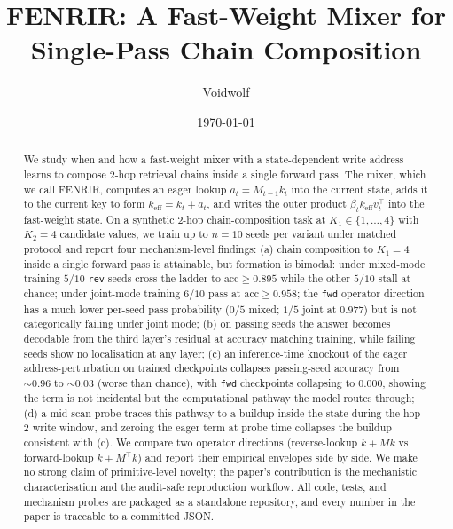 \documentclass[11pt]{article}
\title{FENRIR: A Fast-Weight Mixer for Single-Pass Chain Composition}
\author[1]{Voidwolf}
\affil[1]{Independent researcher \\ \texttt{research@voidwolf.space}}
\date{\today}
\newcommand{\claim}[1]{#1}
\begin{document}
\maketitle

\begin{abstract}
We study when and how a fast-weight mixer with a state-dependent write
address learns to compose 2-hop retrieval chains inside a single
forward pass. The mixer, which we call FENRIR, computes an eager
lookup $a_t = M_{t-1} k_t$ into the current state, adds it to the
current key to form $k_{\text{eff}} = k_t + a_t$, and writes the outer
product $\beta_t k_{\text{eff}} v_t^{\top}$ into the fast-weight state.
On a synthetic 2-hop chain-composition task at $K_1 \in \{1, \dots, 4\}$
with $K_2 = 4$ candidate values, we train up to $n = 10$ seeds per
variant under matched protocol and report four mechanism-level
findings: (a) chain composition to $K_1 = 4$ inside a single forward
pass is attainable, but formation is bimodal: under mixed-mode
training \claim{$5/10$} \texttt{rev} seeds cross the ladder to
$\text{acc} \geq 0.895$ while the other $5/10$ stall at chance;
under joint-mode training \claim{$6/10$} pass at $\text{acc} \geq
0.958$; the \texttt{fwd} operator direction has a much lower per-seed
pass probability ($0/5$ mixed; $1/5$ joint at $0.977$) but is not
categorically failing under joint mode;
(b) on passing seeds the answer becomes decodable from the third
layer's residual at accuracy matching training, while failing seeds
show no localisation at any layer; (c) an inference-time knockout of
the eager address-perturbation on trained checkpoints collapses
passing-seed accuracy from $\claim{\sim 0.96}$ to $\claim{\sim 0.03}$
(worse than chance), with \texttt{fwd} checkpoints collapsing to
$0.000$, showing the term is not incidental but the computational
pathway the model routes through; (d) a mid-scan probe traces this
pathway to a buildup inside the state during the hop-2 write window,
and zeroing the eager term at probe time collapses the buildup
consistent with (c). We compare two operator directions (reverse-lookup
$k + M k$ vs forward-lookup $k + M^{\top} k$) and report their
empirical envelopes side by side. We make no strong claim of
primitive-level novelty; the paper's contribution is the
mechanistic characterisation and the audit-safe reproduction
workflow. All code, tests, and mechanism probes are packaged as a
standalone repository, and every number in the paper is traceable to
a committed JSON.
\end{abstract}
\end{document}
